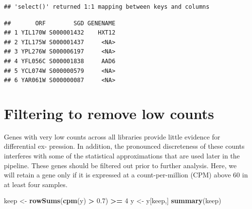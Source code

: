 \documentclass[
]{book}
\newenvironment{Shaded}{\begin{snugshade}}{\end{snugshade}}
\newcommand{\AttributeTok}[1]{\textcolor[rgb]{0.13,0.29,0.53}{#1}}
\newcommand{\DecValTok}[1]{\textcolor[rgb]{0.00,0.00,0.81}{#1}}
\newcommand{\FloatTok}[1]{\textcolor[rgb]{0.00,0.00,0.81}{#1}}
\newcommand{\FunctionTok}[1]{\textcolor[rgb]{0.13,0.29,0.53}{\textbf{#1}}}
\newcommand{\NormalTok}[1]{#1}
\newcommand{\OtherTok}[1]{\textcolor[rgb]{0.56,0.35,0.01}{#1}}
\newcommand{\SpecialCharTok}[1]{\textcolor[rgb]{0.81,0.36,0.00}{\textbf{#1}}}
\newcommand{\StringTok}[1]{\textcolor[rgb]{0.31,0.60,0.02}{#1}}
\begin{document}
\begin{Shaded}
\end{Shaded}

\begin{verbatim}
## 'select()' returned 1:1 mapping between keys and columns
\end{verbatim}

\begin{Shaded}
\end{Shaded}

\begin{verbatim}
##       ORF        SGD GENENAME
## 1 YIL170W S000001432    HXT12
## 2 YIL175W S000001437     <NA>
## 3 YPL276W S000006197     <NA>
## 4 YFL056C S000001838     AAD6
## 5 YCL074W S000000579     <NA>
## 6 YAR061W S000000087     <NA>
\end{verbatim}

\hypertarget{filtering-to-remove-low-counts-2}{%
\section{Filtering to remove low counts}\label{filtering-to-remove-low-counts-2}}

Genes with very low counts across all libraries provide little evidence
for differential ex- pression. In addition, the pronounced discreteness
of these counts interferes with some of the statistical approximations
that are used later in the pipeline. These genes should be filtered out
prior to further analysis. Here, we will retain a gene only if it is
expressed at a count-per-million (CPM) above 60 in at least four
samples.

\begin{Shaded}
\begin{Highlighting}[]
\NormalTok{keep }\OtherTok{\textless{}{-}} \FunctionTok{rowSums}\NormalTok{(}\FunctionTok{cpm}\NormalTok{(y) }\SpecialCharTok{\textgreater{}} \FloatTok{0.7}\NormalTok{) }\SpecialCharTok{\textgreater{}=} \DecValTok{4}
\NormalTok{y }\OtherTok{\textless{}{-}}\NormalTok{ y[keep,]}
\FunctionTok{summary}\NormalTok{(keep)}
\end{Highlighting}
\end{Shaded}
\end{document}
